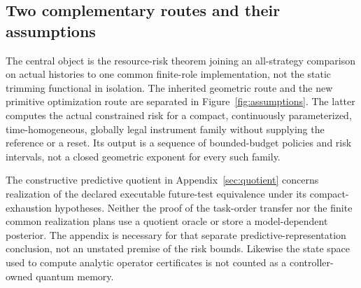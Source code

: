 \subsection*{Two complementary routes and their assumptions}
The central object is the resource-risk theorem joining an all-strategy comparison on actual histories to one common finite-role implementation, not the static trimming functional in isolation. The inherited geometric route and the new primitive optimization route are separated in Figure~\ref{fig:assumptions}. The latter computes the actual constrained risk for a compact, continuously parameterized, time-homogeneous, globally legal instrument family without supplying the reference or a reset. Its output is a sequence of bounded-budget policies and risk intervals, not a closed geometric exponent for every such family.

The constructive predictive quotient in Appendix~\ref{sec:quotient} concerns realization of the declared executable future-test equivalence under its compact-exhaustion hypotheses. Neither the proof of the task-order transfer nor the finite common realization plans use a quotient oracle or store a model-dependent posterior. The appendix is necessary for that separate predictive-representation conclusion, not an unstated premise of the risk bounds. Likewise the state space used to compute analytic operator certificates is not counted as a controller-owned quantum memory.

